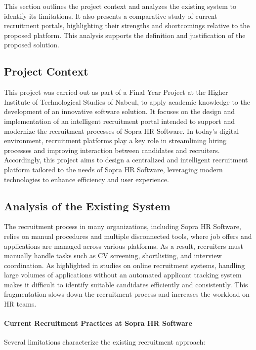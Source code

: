 This section outlines the project context and analyzes the existing system to identify its limitations. It also presents a comparative study of current recruitment portals, highlighting their strengths and shortcomings relative to the proposed platform. This analysis supports the definition and justification of the proposed solution.

\subsection{Project Context}

This project was carried out as part of a Final Year Project at the Higher Institute of Technological Studies of Nabeul, to apply academic knowledge to the development of an innovative software solution. It focuses on the design and implementation of an intelligent recruitment portal intended to support and modernize the recruitment processes of Sopra HR Software. In today's digital environment, recruitment platforms play a key role in streamlining hiring processes and improving interaction between candidates and recruiters. Accordingly, this project aims to design a centralized and intelligent recruitment platform tailored to the needs of Sopra HR Software, leveraging modern technologies to enhance efficiency and user experience.

\subsection{Analysis of the Existing System}

The recruitment process in many organizations, including Sopra HR Software, relies on manual procedures and multiple disconnected tools, where job offers and applications are managed across various platforms. As a result, recruiters must manually handle tasks such as CV screening, shortlisting, and interview coordination. As highlighted in studies on online recruitment systems, handling large volumes of applications without an automated applicant tracking system makes it difficult to identify suitable candidates efficiently and consistently. This fragmentation slows down the recruitment process and increases the workload on HR teams.

\paragraph*{Current Recruitment Practices at Sopra HR Software}

Several limitations characterize the existing recruitment approach:

